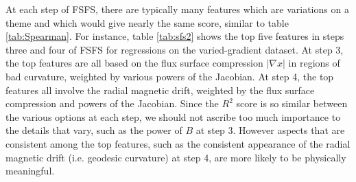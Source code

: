 \documentclass{jpp}
\begin{document}
At each step of FSFS, there are typically many features which are variations on a theme and which would give nearly the same score, similar to table \ref{tab:Spearman}.
For instance, table \ref{tab:sfs2} shows the top five features in steps three and four of FSFS for regressions on the varied-gradient dataset.
At step 3, the top features are all based on the flux surface compression $|\nabla x|$ in regions of bad curvature, weighted by various powers of the Jacobian.
At step 4, the top features all involve the radial magnetic drift, weighted by the flux surface compression and powers of the Jacobian.
Since the $R^2$ score is so similar between the various options at each step, we should not ascribe too much importance to the details that vary, such as the power of $B$ at step 3.
However aspects that are consistent among the top features, such as the consistent appearance of the radial magnetic drift (i.e. geodesic curvature) at step 4, are more likely to be physically meaningful.
\end{document}
